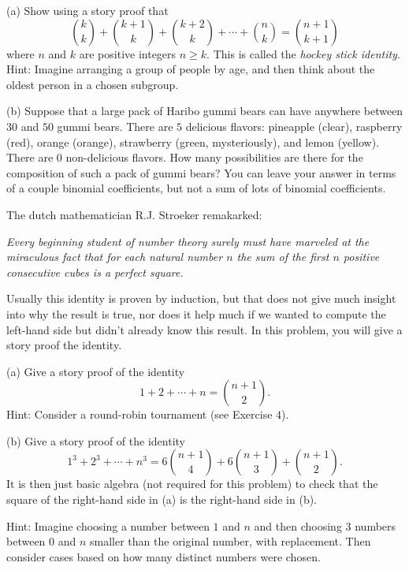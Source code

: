 \begin{tcolorbox}[title=Problem 20, breakable]
    (a) Show using a story proof that 
    \[\binom{k}{k} + \binom{k + 1}{k} + \binom{k + 2}{k} + \cdots + \binom{n}{k} = \binom{n + 1}{k + 1}\]
    where $n$ and $k$ are positive integers $n \ge k$. This is called the 
    \emph{hockey stick identity}. Hint: Imagine arranging a group of people by age,
    and then think about the oldest person in a chosen subgroup.

    (b) Suppose that a large pack of Haribo gummi bears can have anywhere between $30$ and $50$
    gummi bears. There are $5$ delicious flavors: pineapple (clear), raspberry (red),
    orange (orange), strawberry (green, mysteriously), and lemon (yellow).
    There are $0$ non-delicious flavors. How many possibilities are there for the 
    composition of such a pack of gummi bears? You can leave your answer in terms of a 
    couple binomial coefficients, but not a sum of lots of binomial coefficients.
\end{tcolorbox}

\newpage
\begin{tcolorbox}[title=Problem 22, breakable]
    The dutch mathematician R.J. Stroeker remakarked:

    \emph{Every beginning student of number theory surely must have marveled at the 
    miraculous fact that for each natural number $n$ the sum of the first $n$ positive 
    consecutive cubes is a perfect square.}

    Usually this identity is proven by induction, but that does not give much insight
    into why the result is true, nor does it help much if we wanted to compute the 
    left-hand side but didn't already know this result. In this problem, you will give a 
    story proof the identity.
    
    (a) Give a story proof of the identity
    \[1 + 2 + \cdots + n = \binom{n + 1}{2}.\]
    Hint: Consider a round-robin tournament (see Exercise $4$).

    (b) Give a story proof of the identity
    \[1^3 + 2^3 + \cdots + n^3 = 6\binom{n + 1}{4} + 6\binom{n + 1}{3} + \binom{n + 1}{2}.\]
    It is then just basic algebra (not required for this problem) to check that the square of 
    the right-hand side in (a) is the right-hand side in (b).

    Hint: Imagine choosing a number between $1$ and $n$ and then choosing $3$ numbers between $0$ and $n$
    smaller than the original number, with replacement. Then consider cases based on how many distinct 
    numbers were chosen.
\end{tcolorbox}

